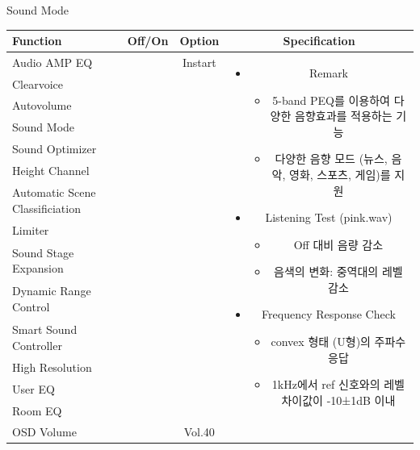 \documentclass{beamer}
\begin{document}
\begin{frame}[t]{Sound Mode}
\begin{tiny}
\begin{tabular}{@{}lccc@{}}
\toprule
Function & Off/On & Option & Specification \\
\midrule
Audio AMP EQ & \color{black}{Off} & Instart &
\multirow{14}{60mm}{
\begin{itemize}
\item Remark
	\begin{itemize}
	\item 5-band PEQ를 이용하여 다양한 음향효과를 적용하는 기능
	\item 다양한 음향 모드 (뉴스, 음악, 영화, 스포츠, 게임)를 지원
	\end{itemize}
\item Listening Test (pink.wav)
	\begin{itemize}
	\item Off 대비 음량 감소
	\item 음색의 변화: 중역대의 레벨 감소
	\end{itemize}
\item Frequency Response Check
  \begin{itemize}
  \item convex 형태 (U형)의 주파수응답
  \item 1kHz에서 ref 신호와의 레벨 차이값이 -10±1dB 이내
  \end{itemize}
\end{itemize}
} \\
Clearvoice & \color{black}{Off} & & \\
Autovolume & \color{black}{Off} & & \\
Sound Mode & \color{blue}{On} & & \\
Sound Optimizer & \color{black}{Off} & & \\
Height Channel & \color{black}{Off} & & \\
Automatic Scene Classificiation & \color{black}{Off} & & \\
Limiter & \color{black}{Off} & & \\
Sound Stage Expansion & \color{black}{Off} & & \\
Dynamic Range Control & \color{black}{Off} & & \\
Smart Sound Controller & \color{black}{Off} & & \\
High Resolution & \color{black}{Off} & & \\
User EQ & \color{black}{Off} & & \\
Room EQ & \color{black}{Off} & & \\
OSD Volume & \color{blue}{On} & Vol.40 & \\
\midrule
\end{tabular}
\end{tiny}


\end{frame}
\end{document}
